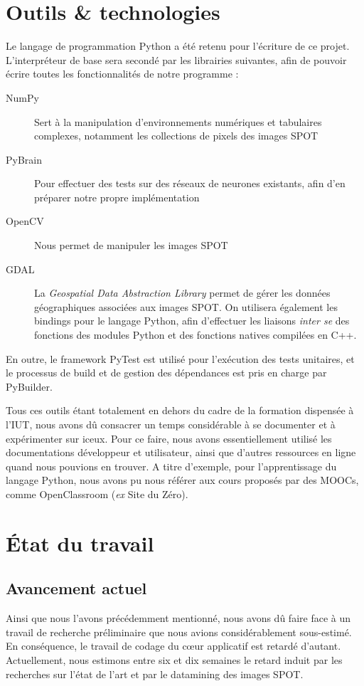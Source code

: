 \documentclass[a4paper, 12pt]{article}
\begin{document}
\section{Outils \& technologies}
Le langage de programmation Python a été retenu pour l'écriture de ce projet. L'interpréteur de base sera secondé par les librairies suivantes, afin de pouvoir écrire toutes les fonctionnalités de notre programme :
\begin{description}
	\item[NumPy] Sert à la manipulation d’environnements numériques et tabulaires complexes, notamment les collections de pixels des images SPOT
	\item[PyBrain] Pour effectuer des tests sur des réseaux de neurones existants, afin d'en préparer notre propre implémentation
	\item[OpenCV] Nous permet de manipuler les images SPOT
	\item[GDAL] La \emph{Geospatial Data Abstraction Library} permet de gérer les données géographiques associées aux images SPOT. On utilisera également les bindings pour le langage Python, afin d'effectuer les liaisons \textit{inter se} des fonctions des modules Python et des fonctions natives compilées en C++.
\end{description}

En outre, le framework PyTest est utilisé pour l’exécution des tests unitaires, et le processus de build et de gestion des dépendances est pris en charge par PyBuilder.

Tous ces outils étant totalement en dehors du cadre de la formation dispensée à l'IUT, nous avons dû consacrer un temps considérable à se documenter et à expérimenter sur iceux. Pour ce faire, nous avons essentiellement utilisé les documentations développeur et utilisateur, ainsi que d'autres ressources en ligne quand nous pouvions en trouver. A titre d'exemple, pour l'apprentissage du langage Python, nous avons pu nous référer aux cours proposés par des MOOCs, comme OpenClassroom (\textit{ex} Site du Zéro).

\section{État du travail}
\subsection{Avancement actuel}
Ainsi que nous l'avons précédemment mentionné, nous avons dû faire face à un travail de recherche préliminaire que nous avions considérablement sous-estimé. En conséquence, le travail de codage du cœur applicatif est retardé d'autant. Actuellement, nous estimons entre six et dix semaines le retard induit par les recherches sur l'état de l'art et par le datamining des images SPOT.
\end{document}
